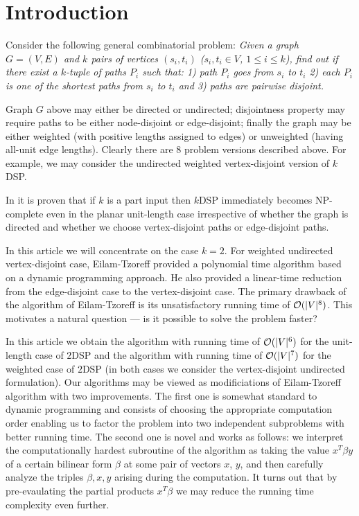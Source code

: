 \section{Introduction}

Consider the following general combinatorial problem: \emph{Given a graph $G = (V, E)$ and $k$ pairs of vertices $(s_i, t_i)$ ($s_i, t_i \in V$, $1 \leq i \leq k$), find out if there exist a $k$-tuple of paths $P_i$ such that: 1) path $P_i$ goes from $s_i$ to $t_i$ 2) each $P_i$ is one of the shortest paths from $s_i$ to $t_i$ and 3) paths are pairwise disjoint.}

Graph $G$ above may either be directed or undirected; disjointness property may require paths to be either node-disjoint or edge-disjoint; finally the graph may be either weighted (with positive lengths assigned to edges) or unweighted (having all-unit edge lengths). Clearly there are 8 problem versions described above. For example, we may consider the undirected weighted vertex-disjoint version of $k$DSP.

In \cite{ET} it is proven that if $k$ is a part input then $k$DSP immediately becomes NP-complete even in the planar unit-length case irrespective of whether the graph is directed and whether we choose vertex-disjoint paths or edge-disjoint paths. 

In this article we will concentrate on the case $k=2$. For weighted undirected vertex-disjoint case, Eilam-Tzoreff provided a polynomial time algorithm based on a dynamic programming approach. He also provided a linear-time reduction from the edge-disjoint case to the vertex-disjoint case. The primary drawback of the algorithm of Eilam-Tzoreff is its unsatisfactory running time of $\mathcal{O}(|V|^8)$. This motivates a natural question --- is it possible to solve the problem faster?

In this article we obtain the algorithm with running time of $\mathcal{O}(|V|^6)$ for the unit-length case of $2$DSP and the algorithm with running time of $\mathcal{O}(|V|^7)$ for the weighted case of $2$DSP (in both cases we consider the vertex-disjoint undirected formulation). Our algorithms may be viewed as modificiations of Eilam-Tzoreff algorithm with two improvements. The first one is somewhat standard to dynamic programming and consists of choosing the appropriate computation order enabling us to factor the problem into two independent subproblems with better running time. The second one is novel and works as follows: we interpret the computationally hardest subroutine of the algorithm as taking the value $x^T\beta y$ of a certain bilinear form $\beta$ at some pair of vectors $x$, $y$, and then carefully analyze the triples $\beta, x, y$ arising during the computation. It turns out that by pre-evaulating the partial products $x^T \beta$ we may reduce the running time complexity even further.

